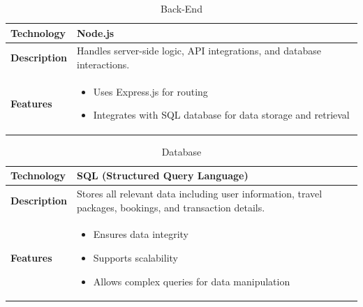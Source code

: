 \documentclass{scrreprt}
\begin{document}
    \vspace{0.5cm}
    
    \begin{table}[ht]
    \centering
    \caption{Back-End}
    \begin{tabular}{|p{4cm}|p{10cm}|}
    \hline
    \textbf{Technology} & Node.js \\
    \hline
    \textbf{Description} & Handles server-side logic, API integrations, and database interactions. \\
    \hline
    \textbf{Features} &
    \begin{itemize}[label=$\bullet$]
      \item Uses Express.js for routing
      \item Integrates with SQL database for data storage and retrieval
    \end{itemize} \\
    \hline
    \end{tabular}
    \end{table}
    
    \vspace{0.5cm}
    
    \begin{table}[ht]
    \centering
    \caption{Database}
    \begin{tabular}{|p{4cm}|p{10cm}|}
    \hline
    \textbf{Technology} & SQL (Structured Query Language) \\
    \hline
    \textbf{Description} & Stores all relevant data including user information, travel packages, bookings, and transaction details. \\
    \hline
    \textbf{Features} &
    \begin{itemize}[label=$\bullet$]
      \item Ensures data integrity
      \item Supports scalability
      \item Allows complex queries for data manipulation
    \end{itemize} \\
    \hline
    \end{tabular}
    \end{table}
    
    \vspace{0.5cm}
    
\end{document}
